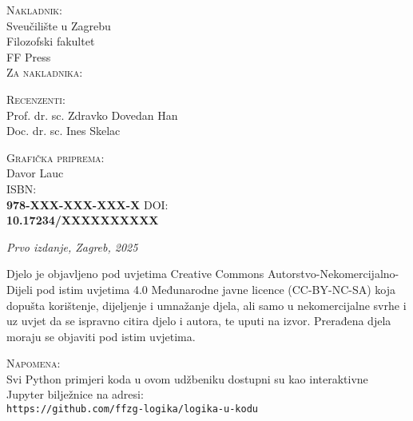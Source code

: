 \documentclass[11pt,a4paper,twoside,openright]{book}
\theoremstyle{definition}
\theoremstyle{plain}
\theoremstyle{remark}
\begin{document}
\frontmatter

\newpage
\thispagestyle{empty}
\vspace*{\fill}
\noindent
\setlength{\parindent}{0pt}
\setlength{\parskip}{\baselineskip}
\textsc{Nakladnik}: \\
Sveučilište u Zagrebu \\
Filozofski fakultet \\
FF Press \\
\vspace{0.7cm}
\textsc{Za nakladnika}:\\
\vspace{0.7cm}

\textsc{Recenzenti}: \\
Prof. dr. sc. Zdravko Dovedan Han \\
Doc. dr. sc. Ines Skelac \\
\vspace{0.7cm}

\textsc{Grafička priprema}: \\
Davor Lauc \\

\vspace{0.7cm}
\textsc{ISBN:} \\ {\bfseries 978-XXX-XXX-XXX-X}
\textsc{DOI:} \\ {\bfseries 10.17234/XXXXXXXXXX}

\vspace{0.7cm}
\textit{Prvo izdanje, Zagreb, 2025}

\vspace{0.7cm}
Djelo je objavljeno pod uvjetima Creative Commons Autorstvo-Nekomercijalno-Dijeli pod istim uvjetima 4.0 Međunarodne javne licence (CC-BY-NC-SA) koja dopušta korištenje, dijeljenje i umnažanje djela, ali samo u nekomercijalne svrhe i uz uvjet da se ispravno citira djelo i autora, te uputi na izvor.
Prerađena djela moraju se objaviti pod istim uvjetima.
\vspace{0.5cm}

\textsc{Napomena}: \\
Svi Python primjeri koda u ovom udžbeniku dostupni su kao interaktivne Jupyter bilježnice na adresi: \\

\texttt{https://github.com/ffzg-logika/logika-u-kodu}
\vspace*{\fill}

\tableofcontents



\mainmatter

\end{document}
